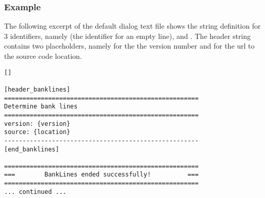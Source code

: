 \subsubsection*{Example}

The following excerpt of the default  dialog text file shows the string definition for 3 identifiers, namely  (the identifier for an empty line),  and .
The header string contains two placeholders, namely  for the the version number and  for the url to the source code location.

\begin{Verbatim}
[]

[header_banklines]
=====================================================
Determine bank lines
=====================================================
version: {version}
source: {location}
-----------------------------------------------------
[end_banklines]

=====================================================
===        BankLines ended successfully!          ===
=====================================================
... continued ...
\end{Verbatim}